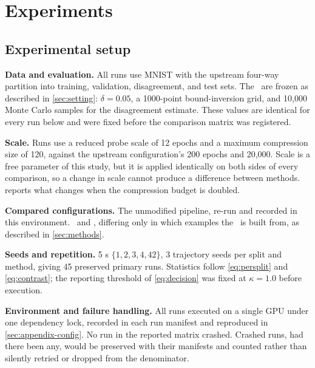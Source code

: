 \section{Experiments}
\label{sec:experiments}

\subsection{Experimental setup}
\label{sec:setup}

\textbf{Data and evaluation.}
All runs use MNIST with the upstream four-way partition into training,
validation, disagreement, and test sets. The \evalsem\ are frozen as described in
\cref{sec:setting}: $\delta = 0.05$, a 1000-point bound-inversion grid, and
10{,}000 Monte Carlo samples for the disagreement estimate. These values are
identical for every run below and were fixed before the comparison matrix was
registered.

\textbf{Scale.}
Runs use a reduced probe scale of 12 epochs and a maximum compression size of
120, against the upstream configuration's 200 epochs and 20{,}000. Scale is a
free parameter of this study, but it is applied identically on both sides of
every comparison, so a change in scale cannot produce a difference between
methods.  reports what changes when the compression budget is
doubled.

\textbf{Compared configurations.}
 The unmodified pipeline,
re-run and recorded in this environment.
 \methodmax\ and
\methodrandom, differing only in which examples the \surrogate\ is built from,
as described in \cref{sec:methods}.

\textbf{Seeds and repetition.}
5 \splitseed{}s $\{1,2,3,4,42\}$, 3 trajectory seeds per split and method, giving
45 preserved primary runs. Statistics follow \cref{eq:persplit} and
\cref{eq:contrast}; the reporting threshold of \cref{eq:decision} was fixed at
$\kappa = 1.0$ before execution.

\textbf{Environment and failure handling.}
All runs executed on a single GPU under one dependency lock, recorded in each run
manifest and reproduced in \cref{sec:appendix-config}. No run in the reported
matrix crashed. Crashed runs, had there been any, would be preserved with their
manifests and counted rather than silently retried or dropped from the
denominator.

